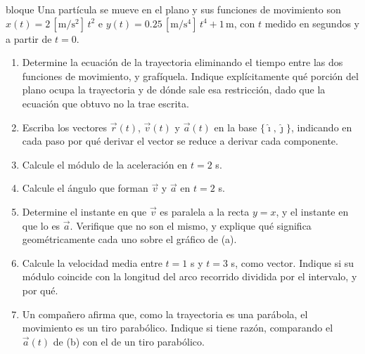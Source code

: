 \documentclass[11pt,openany]{book}
\begin{document}
\begin{ejercicio}{bloque}
Una partícula se mueve en el plano y sus funciones de movimiento son $x(t) = 2\,[\mathrm{m/s^2}]\,t^2$ e $y(t) = 0.25\,[\mathrm{m/s^4}]\,t^4 + 1\,\mathrm{m}$, con $t$ medido en segundos y a partir de $t = 0$.
\begin{enumerate}[label=(\alph*), leftmargin=1.7em, itemsep=1pt, topsep=3pt]
  \item Determine la ecuación de la trayectoria eliminando el tiempo entre las dos funciones de movimiento, y grafíquela. Indique explícitamente qué porción del plano ocupa la trayectoria y de dónde sale esa restricción, dado que la ecuación que obtuvo no la trae escrita.
  \item Escriba los vectores $\vec r(t)$, $\vec v(t)$ y $\vec a(t)$ en la base $\{\hat\imath, \hat\jmath\}$, indicando en cada paso por qué derivar el vector se reduce a derivar cada componente.
  \item Calcule el módulo de la aceleración en $t = 2$ s.
  \item Calcule el ángulo que forman $\vec v$ y $\vec a$ en $t = 2$ s.
  \item Determine el instante en que $\vec v$ es paralela a la recta $y = x$, y el instante en que lo es $\vec a$. Verifique que no son el mismo, y explique qué significa geométricamente cada uno sobre el gráfico de (a).
  \item Calcule la velocidad media entre $t = 1$ s y $t = 3$ s, como vector. Indique si su módulo coincide con la longitud del arco recorrido dividida por el intervalo, y por qué.
  \item Un compañero afirma que, como la trayectoria es una parábola, el movimiento es un tiro parabólico. Indique si tiene razón, comparando el $\vec a(t)$ de (b) con el de un tiro parabólico.
\end{enumerate}
\end{ejercicio}
\end{document}
